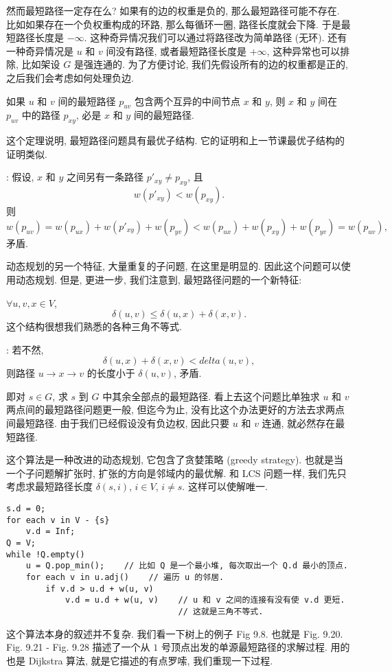 \documentclass[a4paper]{ctexart}
\theoremstyle{definition}
\theoremstyle{definition}
\begin{document}
然而最短路径一定存在么? 如果有的边的权重是负的, 那么最短路径可能不存在.
比如如果存在一个负权重构成的环路, 那么每循环一圈, 路径长度就会下降.
于是最短路径长度是 $-\infty$. 这种奇异情况我们可以通过将路径改为简单路径 (无环).
还有一种奇异情况是 $u$ 和 $v$ 间没有路径, 或者最短路径长度是 $+\infty$,
这种异常也可以排除, 比如架设 $G$ 是强连通的. 为了方便讨论,
我们先假设所有的边的权重都是正的, 之后我们会考虑如何处理负边.

 如果 $u$ 和 $v$ 间的最短路径 $p_{uv}$ 包含两个互异的中间节点
$x$ 和 $y$, 则 $x$ 和 $y$ 间在 $p_{uv}$ 中的路径 $p_{xy}$, 必是 $x$ 和 $y$ 间的最短路径.

这个定理说明, 最短路径问题具有最优子结构. 它的证明和上一节课最优子结构的证明类似.

: 假设, $x$ 和 $y$ 之间另有一条路径 $p'_{xy} \neq p_{xy}$, 且
$$
w(p'_{xy}) < w(p_{xy}).
$$
则
$$
w(p_{uv}) = w(p_{ux}) + w(p'_{xy}) + w(p_{yv}) < w(p_{ux}) + w(p_{xy}) + w(p_{yv})
= w(p_{uv}),
$$
矛盾. 

动态规划的另一个特征, 大量重复的子问题, 在这里是明显的. 因此这个问题可以使用动态规划.
但是, 更进一步, 我们注意到, 最短路径问题的一个新特征:

 $\forall u, v, x \in V$,
$$
\delta(u, v) \leq \delta(u, x) + \delta(x, v).
$$
这个结构很想我们熟悉的各种三角不等式.

: 若不然,
$$
\delta(u, x) + \delta(x, v) < delta(u, v),
$$
则路径 $u \to x \to v$ 的长度小于 $\delta(u, v)$, 矛盾. 


即对 $s \in G$, 求 $s$ 到 $G$ 中其余全部点的最短路径. 看上去这个问题比单独求
$u$ 和 $v$ 两点间的最短路径问题更一般, 但迄今为止, 没有比这个办法更好的方法去求两点间最短路径.
由于我们已经假设没有负边权, 因此只要 $u$ 和 $v$ 连通, 就必然存在最短路径.

这个算法是一种改进的动态规划, 它包含了贪婪策略 (greedy strategy). 也就是当一个子问题解扩张时,
扩张的方向是邻域内的最优解. 和 LCS 问题一样, 我们先只考虑求最短路径长度 $\delta(s, i)$,
$i \in V$, $i \neq s$. 这样可以使解唯一.

\begin{verbatim}
s.d = 0;
for each v in V - {s}
    v.d = Inf;
Q = V;
while !Q.empty()
    u = Q.pop_min();    // 比如 Q 是一个最小堆, 每次取出一个 Q.d 最小的顶点.
    for each v in u.adj()    // 遍历 u 的邻居.
        if v.d > u.d + w(u, v)    
            v.d = u.d + w(u, v)    // u 和 v 之间的连接有没有使 v.d 更短.
                                   // 这就是三角不等式.
\end{verbatim}
这个算法本身的叙述并不复杂. 我们看一下树上的例子 Fig 9.8. 也就是 Fig. 9.20.
Fig. 9.21 - Fig. 9.28 描述了一个从 $1$ 号顶点出发的单源最短路径的求解过程.
用的也是 Dijkstra 算法, 就是它描述的有点罗嗦, 我们重现一下过程.
\end{document}
